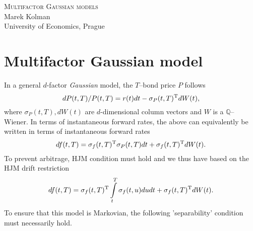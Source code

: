 \documentclass[11pt,a4paper]{article}
\theoremstyle{break} %
\numberwithin{equation}{section}
\begin{document}
	
\begin{titlepage}
\begin{center}
\textsc{\LARGE Multifactor Gaussian models}\\[0.2cm] %
Marek Kolman \\ University of Economics, Prague
\end{center}
\vspace{25pt}
\begin{abstract}
	This text serves as a simple technical document for multifactor Gaussian IR models implemented in the attached script. The model is fully based on \citep[Section 12]{piterbargII}. Attention is paid especially to a 2-factor Gaussian model. 
	\\ \\ \noindent Related python code repository can be found at:
\begin{pabox}{Code repository}
	\begin{center}
		\url{https://github.com/marekkolman/gaussian_models}
	\end{center}
\end{pabox}
\noindent The code implements the two-factor model and also contains a calibration data set.
\end{abstract}
\end{titlepage}

\section{Multifactor Gaussian model}
In a general $d$-factor \textit{Gaussian} model, the $T$--bond price $P$ follows
\begin{equation}\label{eq:bond_price_gaussian_2f}
  dP(t,T)/P(t,T) = r(t)dt - {\sigma _P}{(t,T)^{\rm{T}}}dW(t),
\end{equation}
where ${\sigma _P}(t,T), dW(t)$ are $d$-dimensional column vectors and $W$ is a $\mathbb{Q}$--Wiener. In terms of instantaneous forward rates, the above can equivalently be written in terms of instantaneous forward rates
\begin{equation*}
  df(t,T) = {\sigma _f}{(t,T)^{\rm{T}}}{\sigma _P}(t,T)dt + {\sigma _f}{(t,T)^{\rm{T}}}dW(t).
\end{equation*}
To prevent arbitrage, HJM condition must hold and we thus have based on the HJM drift restriction
\begin{equation*}
  df(t,T) = {\sigma _f}{(t,T)^{\rm{T}}}\int\limits_t^T {{\sigma _f}(t,u)du} dt + {\sigma _f}{(t,T)^{\rm{T}}}dW(t).
\end{equation*}
To ensure that this model is Markovian, the following 'separability' condition must necessarily hold.
\end{document}
